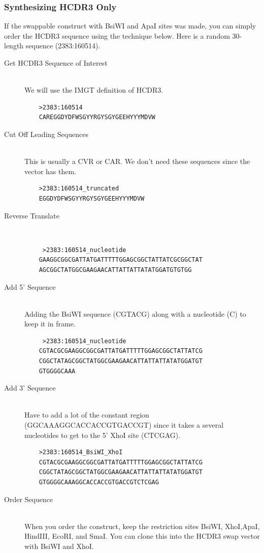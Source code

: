 \subsubsection{Synthesizing HCDR3 Only}
If the swappable construct with BsiWI and ApaI sites was made, you can simply order the HCDR3 sequence using the technique below. Here is a random 30-length sequence (2383:160514).
\begin{description}
  \item[Get HCDR3 Sequence of Interest] \hfill \\
  We will use the IMGT definition of HCDR3.
    \begin{verbatim}
    >2383:160514
    CAREGGDYDFWSGYYRGYSGYGEEHYYYMDVW
    \end{verbatim}
 \item[Cut Off Leading Sequences] \hfill \\
 This is usually a CVR or CAR. We don't need these sequences since the vector has them.
    \begin{verbatim}
    >2383:160514_truncated
    EGGDYDFWSGYYRGYSGYGEEHYYYMDVW
    \end{verbatim}
 \item[Reverse Translate] \hfill \\
    \begin{verbatim}
     >2383:160514_nucleotide
    GAAGGCGGCGATTATGATTTTTGGAGCGGCTATTATCGCGGCTAT
    AGCGGCTATGGCGAAGAACATTATTATTATATGGATGTGTGG
    \end{verbatim}
 \item[Add 5' Sequence] \hfill \\
 Adding the BsiWI sequence (CGTACG) along with a nucleotide (C) to keep it in frame.
    \begin{verbatim}
     >2383:160514_nucleotide
    CGTACGCGAAGGCGGCGATTATGATTTTTGGAGCGGCTATTATCG
    CGGCTATAGCGGCTATGGCGAAGAACATTATTATTATATGGATGT
    GTGGGGCAAA
    \end{verbatim}
\item[Add 3' Sequence] \hfill \\
Have to add a lot of the constant region (GGCAAAGGCACCACCGTGACCGT) since it takes a several nucleotides to get to the 5' XhoI site (CTCGAG).
    \begin{verbatim}
    >2383:160514_BsiWI_XhoI
    CGTACGCGAAGGCGGCGATTATGATTTTTGGAGCGGCTATTATCG
    CGGCTATAGCGGCTATGGCGAAGAACATTATTATTATATGGATGT
    GTGGGGCAAAGGCACCACCGTGACCGTCTCGAG
    \end{verbatim}
\item[Order Sequence] \hfill \\
 When you order the construct, keep the restriction sites BsiWI, XhoI,ApaI, HindIII, EcoRI, and SmaI. You can clone this into the HCDR3 swap vector with BsiWI and XhoI.
\end{description}

